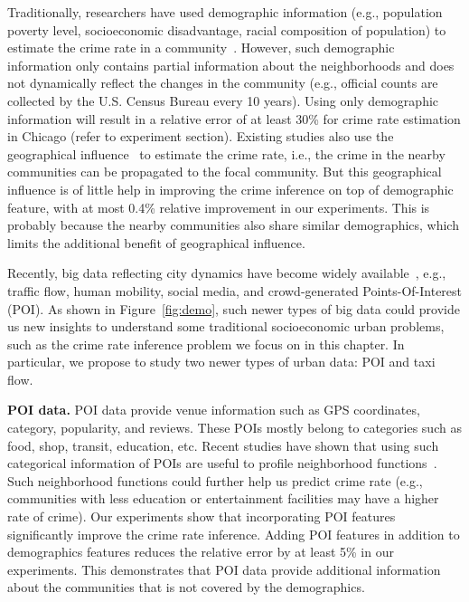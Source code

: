 Traditionally, researchers have used demographic information (e.g., population poverty level, socioeconomic disadvantage, racial composition of population) to estimate the crime rate in a community~\cite{GrSa09}. However,  such demographic information only contains partial information about the neighborhoods and does not dynamically reflect the changes in the community (e.g., official counts are collected by the U.S. Census Bureau every 10 years). Using only demographic information will result in a relative error of at least 30\% for crime rate estimation in Chicago (refer to experiment section). Existing studies also use the geographical influence~\cite{Ans02} to estimate the crime rate, i.e., the crime in the nearby communities can be propagated to the focal community. But this geographical influence is of little help in improving the crime inference on top of demographic feature, with at most 0.4\% relative improvement in our experiments. This is probably because the nearby communities also share similar demographics, which limits the additional benefit of geographical influence.



Recently, big data reflecting city dynamics have become widely available~\cite{ZCWY14}, e.g., traffic flow, human mobility, social media, and crowd-generated Points-Of-Interest (POI). As shown in Figure~\ref{fig:demo}, such newer types of big data could provide us new insights to understand some traditional socioeconomic urban problems, such as the crime rate inference problem we focus on in this chapter. In particular, we propose to study two newer types of urban data: POI and taxi flow. 

\textbf{POI data.} POI data provide venue information such as GPS coordinates, category, popularity, and reviews. These POIs mostly belong to categories such as food, shop, transit, education, etc. Recent studies have shown that using such categorical information of POIs are useful to profile neighborhood functions~\cite{YZX12}. Such neighborhood functions could further help us predict crime rate (e.g., communities with less education or entertainment facilities may have a higher rate of crime). Our experiments show that incorporating POI features   significantly improve the crime rate inference. Adding POI features in addition to demographics features reduces the relative error by at least 5\% in our experiments. This demonstrates that POI data provide additional information about the communities that is not covered by the demographics.

